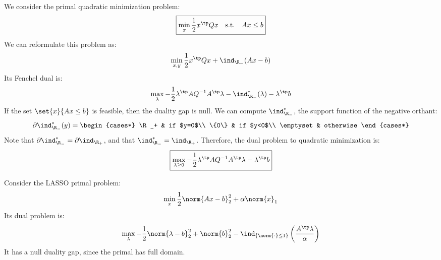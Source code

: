 \begin{example}
    We consider the primal quadratic minimization problem:
    \begin{equation*}
        \boxed{\min_x \frac{1}{2}x^\tp Qx \quad\text{s.t.}\quad Ax\leq b}
    \end{equation*}
    We can reformulate this problem as:
    \begin{equation*}
        \min_{x, y} \frac{1}{2}x^\tp Qx + \ind_{\R_-}(Ax-b)
    \end{equation*}
    Its Fenchel dual is:
    \begin{equation*}
        \max_\lambda -\frac{1}{2}\lambda^\tp AQ^{-1}A^\tp\lambda - \ind_{\R_-}^*(\lambda) - \lambda^\tp b
    \end{equation*}
    If the set $\set{x}{Ax\leq b}$ is feasible, then the duality gap is null. We can compute $\ind_{\R_-}^*$, the support function of the negative orthant:
    \begin{equation*}
        \partial\ind_{\R_-}^*(y) = \begin{cases*}
            \R_+ & if $y=0$\\
            \{0\} & if $y<0$\\
            \emptyset & otherwise
        \end{cases*}
    \end{equation*}
    Note that $\partial\ind_{\R_-}^* = \partial\ind_{\R_+}$, and that $\ind_{\R_-}^* = \ind_{\R_+}$. Therefore, the dual problem to quadratic minimization is:
    \begin{equation}
        \boxed{\max_{\lambda\geq0} -\frac{1}{2}\lambda^\tp AQ^{-1}A^\tp\lambda - \lambda^\tp b}
    \end{equation}
\end{example}

\begin{example}[LASSO]
    Consider the LASSO primal problem:
    \begin{equation*}
        \min_x \frac{1}{2}\norm{Ax-b}_2^2 + \alpha\norm{x}_1
    \end{equation*}
    Its dual problem is:
    \begin{equation*}
        \max_\lambda -\frac{1}{2}\norm{\lambda-b}_2^2 + \norm{b}_2^2 - \ind_{\{\norm{\cdot}\leq1\}}\left(\frac{A^\tp\lambda}{\alpha}\right)
    \end{equation*}
    It has a null duality gap, since the primal has full domain.
\end{example}

